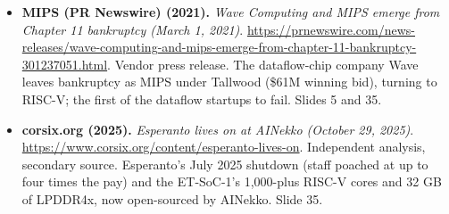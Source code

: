 \begin{itemize}[leftmargin=1.2em,itemsep=3pt]
\item \textbf{MIPS (PR Newswire) (2021).} \textit{Wave Computing and MIPS emerge from Chapter 11 bankruptcy (March 1, 2021)}. \url{https://prnewswire.com/news-releases/wave-computing-and-mips-emerge-from-chapter-11-bankruptcy-301237051.html}. Vendor press release. The dataflow-chip company Wave leaves bankruptcy as MIPS under Tallwood (\$61M winning bid), turning to RISC-V; the first of the dataflow startups to fail. Slides 5 and 35.
\item \textbf{corsix.org (2025).} \textit{Esperanto lives on at AINekko (October 29, 2025)}. \url{https://www.corsix.org/content/esperanto-lives-on}. Independent analysis, secondary source. Esperanto's July 2025 shutdown (staff poached at up to four times the pay) and the ET-SoC-1's 1,000-plus RISC-V cores and 32 GB of LPDDR4x, now open-sourced by AINekko. Slide 35.
\end{itemize}
